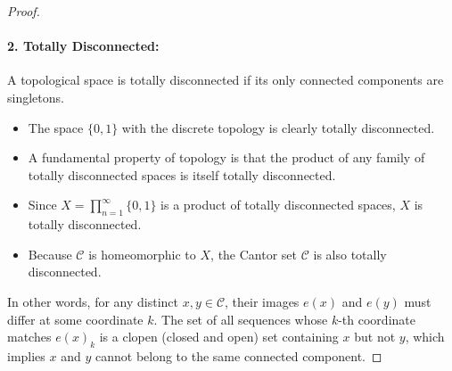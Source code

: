 \documentclass{article}
\begin{document}
\begin{proof}
\paragraph{2. Totally Disconnected:}
A topological space is totally disconnected if its only connected components are singletons.
\begin{itemize}
    \item The space $\{0, 1\}$ with the discrete topology is clearly totally disconnected.
    \item A fundamental property of topology is that the product of any family of totally disconnected spaces is itself totally disconnected. 
    \item Since $X = \prod_{n=1}^\infty \{0, 1\}$ is a product of totally disconnected spaces, $X$ is totally disconnected. 
    \item Because $\mathcal{C}$ is homeomorphic to $X$, the Cantor set $\mathcal{C}$ is also totally disconnected.
\end{itemize}
In other words, for any distinct $x, y \in \mathcal{C}$, their images $e(x)$ and $e(y)$ must differ at some coordinate $k$. The set of all sequences whose $k$-th coordinate matches $e(x)_k$ is a clopen (closed and open) set containing $x$ but not $y$, which implies $x$ and $y$ cannot belong to the same connected component.
\end{proof}
\end{document}

